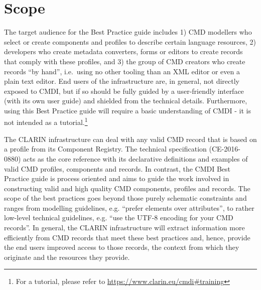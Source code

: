 \section{Scope}\label{scope}

The target audience for the Best Practice guide includes 1) CMD
modellers who select or create components and profiles to describe
certain language resources, 2) developers who create metadata
converters, forms or editors to create records that comply with these
profiles, and 3) the group of CMD creators who create records ``by
hand'', i.e.~using no other tooling than an XML editor or even a plain
text editor. End users of the infrastructure are, in general, not
directly exposed to CMDI, but if so should be fully guided by a
user-friendly interface (with its own user guide) and shielded from the
technical details. Furthermore, using this Best Practice guide will
require a basic understanding of CMDI - it is not intended as a
tutorial.\footnote{For a tutorial, please refer to
  \url{https://www.clarin.eu/cmdi\#training}}

The CLARIN infrastructure can deal with any valid CMD record that is
based on a profile from its Component Registry. The technical
specification (CE-2016-0880) acts as the core reference with its
declarative definitions and examples of valid CMD profiles, components
and records. In contrast, the CMDI Best Practice guide is process
oriented and aims to guide the work involved in constructing valid and
high quality CMD components, profiles and records. The scope of the best
practices goes beyond those purely schematic constraints and ranges from
modelling guidelines, e.g. ``prefer elements over attributes'', to
rather low-level technical guidelines, e.g. ``use the UTF-8 encoding for
your CMD records''. In general, the CLARIN infrastructure will extract
information more efficiently from CMD records that meet these best
practices and, hence, provide the end users improved access to those
records, the context from which they originate and the resources they
provide.

